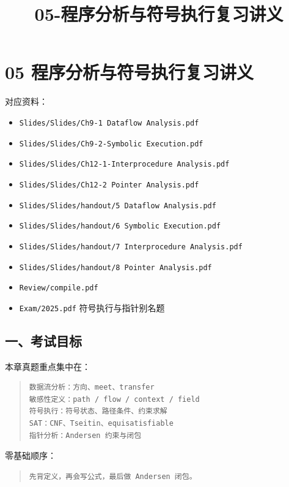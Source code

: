 \documentclass[UTF8,zihao=-4]{ctexart}
\title{05-程序分析与符号执行复习讲义}
\author{}
\date{}
\begin{document}
\maketitle
\setcounter{tocdepth}{1}
\tableofcontents
\newpage
\section{05 程序分析与符号执行复习讲义}


对应资料：


\begin{itemize}
\item \texttt{Slides/Slides/Ch9-1 Dataflow Analysis.pdf}
\item \texttt{Slides/Slides/Ch9-2-Symbolic Execution.pdf}
\item \texttt{Slides/Slides/Ch12-1-Interprocedure Analysis.pdf}
\item \texttt{Slides/Slides/Ch12-2 Pointer Analysis.pdf}
\item \texttt{Slides/Slides/handout/5 Dataflow Analysis.pdf}
\item \texttt{Slides/Slides/handout/6 Symbolic Execution.pdf}
\item \texttt{Slides/Slides/handout/7 Interprocedure Analysis.pdf}
\item \texttt{Slides/Slides/handout/8 Pointer Analysis.pdf}
\item \texttt{Review/compile.pdf}
\item \texttt{Exam/2025.pdf} 符号执行与指针别名题
\end{itemize}


\subsection{一、考试目标}


本章真题重点集中在：


\begin{quote}
\footnotesize
\begin{verbatim}
数据流分析：方向、meet、transfer
敏感性定义：path / flow / context / field
符号执行：符号状态、路径条件、约束求解
SAT：CNF、Tseitin、equisatisfiable
指针分析：Andersen 约束与闭包
\end{verbatim}
\end{quote}


零基础顺序：


\begin{quote}
\footnotesize
\begin{verbatim}
先背定义，再会写公式，最后做 Andersen 闭包。
\end{verbatim}
\end{quote}
\end{document}
